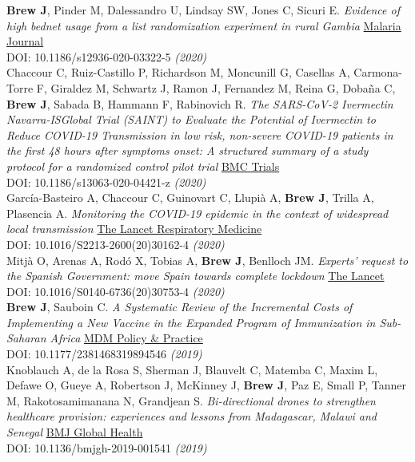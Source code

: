 \documentclass[11pt]{article}
\begin{document}
\noindent \textbf{Brew J}, Pinder M, Dalessandro U, Lindsay SW, Jones C, Sicuri E. \emph{Evidence of high bednet usage from a list randomization experiment in rural Gambia} \href{https://doi.org/10.1186/s12936-020-03322-5}{Malaria Journal} \\ DOI: 10.1186/s12936-020-03322-5 \hfill \emph{(2020)} \\

\noindent Chaccour C, Ruiz-Castillo P, Richardson M, Moncunill G, Casellas A, Carmona-Torre F, Giraldez M, Schwartz J, Ramon J, Fernandez M, Reina G, Dobaña C, \textbf{Brew J}, Sabada B, Hammann F, Rabinovich R. \emph{The SARS-CoV-2 Ivermectin Navarra-ISGlobal Trial (SAINT) to Evaluate the Potential of Ivermectin to Reduce COVID-19 Transmission in low risk, non-severe COVID-19 patients in the first 48 hours after symptoms onset: A structured summary of a study protocol for a randomized control pilot trial} \href{https://trialsjournal.biomedcentral.com/articles/10.1186/s13063-020-04421-z}{BMC Trials} \\ DOI: 10.1186/s13063-020-04421-z \hfill \emph{(2020)} \\


\noindent García-Basteiro A, Chaccour C, Guinovart C, Llupià A, \textbf{Brew J}, Trilla A, Plasencia A. \emph{Monitoring the COVID-19 epidemic in the context of widespread local transmission} \href{https://www.thelancet.com/journals/lanres/article/PIIS2213-2600(20)30162-4/fulltext}{The Lancet Respiratory Medicine} \\ DOI: 10.1016/S2213-2600(20)30162-4 \hfill \emph{(2020)} \\


\noindent Mitjà O, Arenas A, Rodó X, Tobias A, \textbf{Brew J}, Benlloch JM. \emph{Experts' request to the Spanish Government: move Spain towards complete lockdown} \href{https://www.thelancet.com/pb-assets/Lancet/pdfs/S0140673620307534.pdf}{The Lancet} \\ DOI: 10.1016/S0140-6736(20)30753-4 \hfill \emph{(2020)} \\

\noindent \textbf{Brew J}, Sauboin C. \emph{A Systematic Review of the Incremental Costs of Implementing a New Vaccine in the Expanded Program of Immunization in Sub-Saharan Africa} \href{https://doi.org/10.1177/2381468319894546}{MDM Policy & Practice} \\ DOI: 10.1177/2381468319894546 \hfill \emph{(2019)} \\

\noindent Knoblauch A, de la Rosa S, Sherman J, Blauvelt C, Matemba C, Maxim L, Defawe O, Gueye A, Robertson J, McKinney J, \textbf{Brew J}, Paz E, Small P, Tanner M, Rakotosamimanana N, Grandjean S. \emph{Bi-directional drones to strengthen healthcare provision: experiences and lessons from Madagascar, Malawi and Senegal} \href{https://dx.doi.org/10.1136/bmjgh-2019-001541}{BMJ Global Health} \\ DOI: 10.1136/bmjgh-2019-001541 \hfill \emph{(2019)} \\
\end{document}
